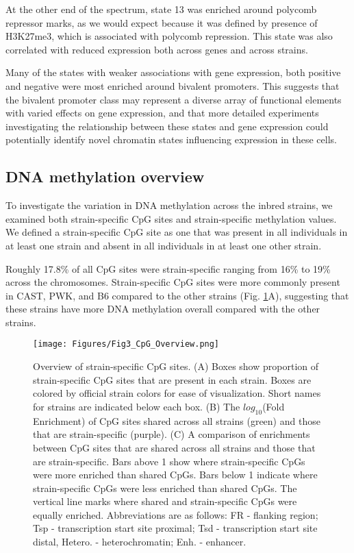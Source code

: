 \documentclass[
  11pt,
]{article}
\begin{document}
At the other end of the spectrum, state 13 was enriched around polycomb
repressor marks, as we would expect because it was defined by presence
of H3K27me3, which is associated with polycomb repression. This state
was also correlated with reduced expression both across genes and across
strains.

Many of the states with weaker associations with gene expression, both
positive and negative were most enriched around bivalent promoters. This
suggests that the bivalent promoter class may represent a diverse array
of functional elements with varied effects on gene expression, and that
more detailed experiments investigating the relationship between these
states and gene expression could potentially identify novel chromatin
states influencing expression in these cells.

\hypertarget{dna-methylation-overview}{%
\subsection{DNA methylation overview}\label{dna-methylation-overview}}

To investigate the variation in DNA methylation across the inbred
strains, we examined both strain-specific CpG sites and strain-specific
methylation values. We defined a strain-specific CpG site as one that
was present in all individuals in at least one strain and absent in all
individuals in at least one other strain.

Roughly 17.8\% of all CpG sites were strain-specific ranging from 16\%
to 19\% across the chromosomes. Strain-specific CpG sites were more
commonly present in CAST, PWK, and B6 compared to the other strains
(Fig. \ref{fig:cpg_overview}A), suggesting that these strains have more
DNA methylation overall compared with the other strains.

\begin{figure}[ht!]
\begin{minipage}[c]{0.4\textwidth}
  \texttt{[image: Figures/Fig3\_CpG\_Overview.png]} 
\end{minipage}\hfill
\begin{minipage}[c]{0.5\textwidth}
\caption{Overview of strain-specific CpG sites. (A) Boxes 
show proportion of strain-specific CpG sites that are present 
in each strain. Boxes are colored by official strain colors
for ease of visualization. Short names for strains are
indicated below each box. (B) The $log_{10}$(Fold Enrichment)
of CpG sites shared across all strains (green) and those
that are strain-specific (purple). (C) A comparison
of enrichments between CpG sites that are shared across all 
strains and those that are strain-specific. Bars above 1
show where strain-specific CpGs were more enriched than 
shared CpGs. Bars below 1 indicate where strain-specific 
CpGs were less enriched than shared CpGs. The vertical 
line marks where shared and strain-specific CpGs were equally 
enriched. Abbreviations are as follows: FR - flanking region; 
Tsp - transcription start site proximal; Tsd - transcription
start site distal, Hetero. - heterochromatin; Enh. - enhancer.
}
\label{fig:cpg_overview}
\end{minipage}
\end{figure}
\end{document}
